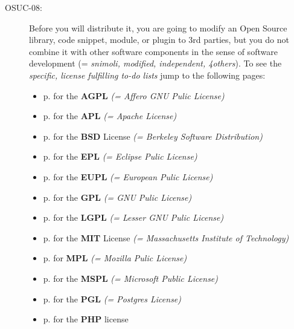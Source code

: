 \begin{description}
\item[OSUC-08:]\label{OSUC-08-DEF} Before you will distribute it, you are going
to modify an Open Source library, code snippet, module, or plugin to 3rd
parties, but you do not combine it with other software components in the sense of
software development (= \textit{snimoli, modified, independent, 4others}). 
To see the \textit{specific, license fulfilling to-do lists} jump to the
following pages:
  \begin{itemize}
    \item p. \pageref{OSUC-08-AGPL} for the \textbf{AGPL}
      \textit{(= Affero GNU Pulic License)} 
    \item p. \pageref{OSUC-08-Apache20} for the \textbf{APL}
      \textit{(= Apache License)}
    \item p. \pageref{OSUC-08-BSD} for the \textbf{BSD} License
      \textit{(= Berkeley Software Distribution)}
    \item p. \pageref{OSUC-08-EPL} for the \textbf{EPL}
      \textit{(= Eclipse Pulic License)}     
    \item p. \pageref{OSUC-08-EUPL} for the \textbf{EUPL}
      \textit{(= European Pulic License)} 
    \item p. \pageref{OSUC-08-GPL} for the \textbf{GPL}
       \textit{(= GNU Pulic License)} 
    \item p. \pageref{OSUC-08-LGPL} for the \textbf{LGPL}
      \textit{(= Lesser GNU Pulic License)}           
    \item p. \pageref{OSUC-08-MIT} for the \textbf{MIT} License
       \textit{(= Massachusetts Institute of Technology)} 
    \item p. \pageref{OSUC-08-MPL} for \textbf{MPL}
      \textit{(= Mozilla Pulic License)}     
    \item p. \pageref{OSUC-08-MsPL} for the \textbf{MSPL}
      \textit{(= Microsoft Public License)} 
    \item p. \pageref{OSUC-08-PGL} for the \textbf{PGL}
      \textit{(= Postgres License)} 
    \item p. \pageref{OSUC-08-PHP} for the \textbf{PHP} license 
  \end{itemize}



\end{description}
